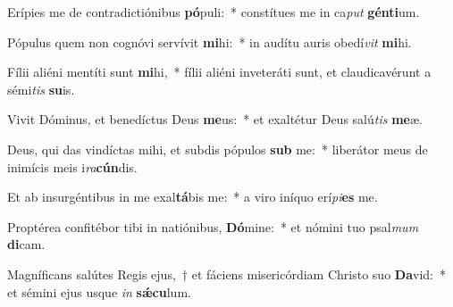 \item Erípies me de contradictiónibus \textbf{pó}puli:~* constítues me in ca\textit{put} \textbf{gén}\textbf{ti}um.
\item Pópulus quem non cognóvi servívit \textbf{mi}hi:~* in audítu auris obedí\textit{vit} \textbf{mi}hi.
\item Fílii aliéni mentíti sunt \textbf{mi}hi,~* fílii aliéni inveteráti sunt, et claudicavérunt a sémi\textit{tis} \textbf{su}is.
\item Vivit Dóminus, et benedíctus Deus \textbf{me}us:~* et exaltétur Deus salú\textit{tis} \textbf{me}æ.
\item Deus, qui das vindíctas mihi, et subdis pópulos \textbf{sub} me:~* liberátor meus de inimícis meis i\textit{ra}\textbf{cún}dis.
\item Et ab insurgéntibus in me exal\textbf{tá}bis me:~* a viro iníquo erí\textit{pi}\textbf{es} me.
\item Proptérea confitébor tibi in natiónibus, \textbf{Dó}mine:~* et nómini tuo psal\textit{mum} \textbf{di}cam.
\item Magníficans salútes Regis ejus,~† et fáciens misericórdiam Christo suo \textbf{Da}vid:~* et sémini ejus usque \textit{in} \textbf{sǽ}\textbf{cu}lum.
